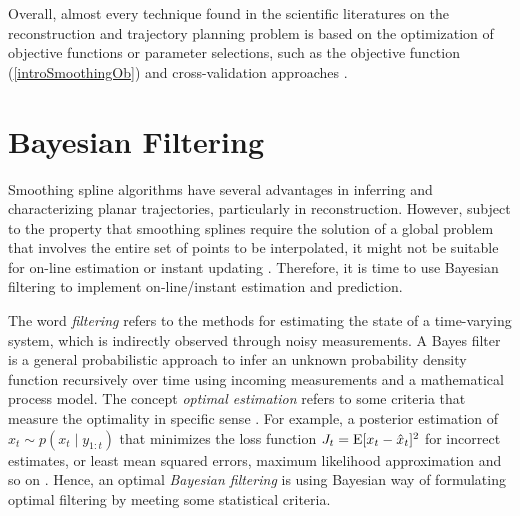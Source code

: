 %

Overall, almost every technique found in the scientific literatures on the reconstruction and trajectory planning problem is based on the optimization of objective functions or parameter selections, such as the objective function (\ref{introSmoothingOb}) and cross-validation approaches \cite{gasparetto2007new}. 



\section{Bayesian Filtering}

Smoothing spline algorithms have several advantages in inferring and characterizing planar trajectories, particularly in reconstruction. However, subject to the property that smoothing splines require the solution of a global problem that involves the entire set of points to be interpolated, it might not be suitable for on-line estimation or instant updating \cite{biagiotti2013online}. Therefore, it is time to use Bayesian filtering to implement on-line/instant estimation and prediction. 

The word \textit{filtering} refers to the methods for estimating the state of a time-varying system, which is indirectly observed through noisy measurements. A Bayes filter is a general probabilistic approach to infer an unknown probability density function recursively over time using incoming measurements and a mathematical process model. The concept \textit{optimal estimation} refers to some criteria that measure the optimality in specific sense \cite{anderson1979optimal}. For example, a posterior estimation of $\hat{x}_t\sim p(x_t\mid y_{1:t})$ that minimizes the loss function $J_t=\mathrm{E}\lbrack x_t-\hat{x}_t\rbrack^2$ for incorrect estimates, or least mean squared errors, maximum likelihood approximation and so on \cite{chen2003bayesian} \cite{sarkka2013bayesian}. Hence, an optimal \textit{Bayesian filtering} is using Bayesian way of formulating optimal filtering by meeting some statistical criteria. 

